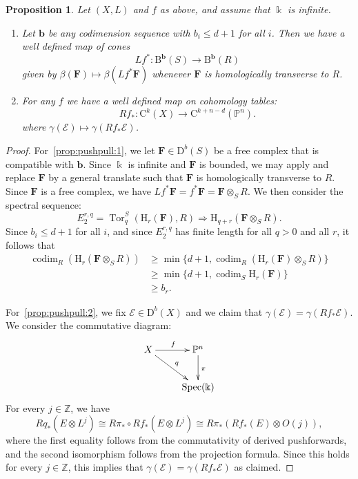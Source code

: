 \documentclass[12pt]{amsart}
\newtheorem{prop}[lemma]{Proposition}
\theoremstyle{definition}
\theoremstyle{remark}
\newcommand{\Spec}{\operatorname{Spec}}
\newcommand{\Tor}{\operatorname{Tor}}
\newcommand{\kk}{\Bbbk}
\newcommand{\codim}{\operatorname{codim}}
\newcommand{\PP}{\mathbb{P}}
\newcommand{\HH}{\mathrm{H}}
\newcommand{\ZZ}{\mathbb{Z}}
\newcommand{\bb}{\mathbf{b}}
\newcommand{\cE}{\mathcal{E}}
\newcommand{\FF}{\mathbf{F}}
\newcommand{\DD}{\mathrm{D}}
\newcommand{\CQ}{\mathrm{C}}
\newcommand{\BBQ}{\mathrm{B}}
\begin{document}
 \begin{prop}\label{prop:pushpull}
Let $(X,L)$ and $f$ as above, and assume that $\kk$ is infinite.
\begin{enumerate}
	\item\label{prop:pushpull:1} Let $\bb$ be any codimension sequence with $b_i\leq d+1$ for all $i$.   Then we have a well defined map of cones
	\[
Lf^*\colon \BBQ^{\bb}(S)\to \BBQ^{\bb}(R)
\]
given by $\beta(\FF)\mapsto \beta(Lf^*\FF)$ whenever $\FF$ is homologically transverse to $R$.  
	\item\label{prop:pushpull:2}	For any $f$ we have a well defined map on cohomology tables:
\[
Rf_*\colon \CQ^k(X)\to \CQ^{k+n-d}(\PP^n).
\]
where $\gamma(\cE)\mapsto \gamma(Rf_* \cE)$.  
\end{enumerate}
\end{prop}
\begin{proof}
For~\eqref{prop:pushpull:1}, we let $\FF\in \DD^b(S)$ be a free complex that is compatible with $\bb$.  Since $\kk$ is infinite and $\FF$ is bounded, we may apply \cite[Theorem]{miller-speyer} and replace $\FF$ by a general translate such that $\FF$ is homologically transverse to $R$.  Since $\FF$ is a free complex, we have $Lf^*\FF=f^*\FF=\FF\otimes_S R$.   We then consider the spectral sequence:
\[
E^{r,q}_2=\Tor^S_{q}(\HH_r(\FF),R)\Rightarrow \HH_{q+r}(\FF\otimes_S R).
\]
Since $b_i\leq d+1$ for all $i$, and since $E^{r,q}_2$ has finite length for all $q>0$ and all $r$, it follows that
\begin{align*}
\codim_R \left(\HH_{r}(\FF\otimes_S R)\right) &\geq \min\{d+1, \codim_R\left( \HH_r(\FF)\otimes_S R\right)\} \\
&\geq \min\{d+1, \codim_S \HH_r(\FF)\}\\
& \geq b_r.
\end{align*}


For~\eqref{prop:pushpull:2},  we fix $\cE\in \DD^b(X)$ and we claim that $\gamma(\cE)=\gamma(Rf_* \cE)$.  We consider the commutative diagram:
\[
\xymatrix{
X\ar[r]^f\ar[rd]^{q}& \PP^n\ar[d]^{\pi}\\
& \Spec(\kk)
}
\]
For every $j\in \ZZ$, we have
\[
Rq_*(E\otimes L^j)
\cong R\pi_* \circ Rf_* (E\otimes L^j)
\cong R\pi_* (  Rf_*(E) \otimes O(j) ),
\]
where the first equality follows from the commutativity of derived pushforwards, and the second isomorphism follows from the projection formula.  Since this holds for every $j\in \ZZ$, this implies that $\gamma(\cE)=\gamma(Rf_* \cE)$ as claimed.
\end{proof}
\end{document}
